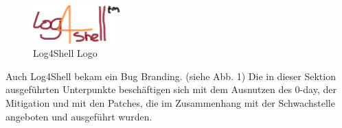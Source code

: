 
\begin{figure}[!htb]
    \begin{center}
        \includegraphics[width=0.3\textwidth]{images/log4shell-logo}
    \end{center}
    \caption{Log4Shell Logo}
\end{figure}

Auch Log4Shell bekam ein Bug Branding. (siehe Abb. 1) Die in dieser Sektion ausgeführten Unterpunkte beschäftigen
sich mit dem Ausnutzen des 0-day, der Mitigation und mit den Patches, die im Zusammenhang mit der Schwachstelle angeboten
und ausgeführt wurden.